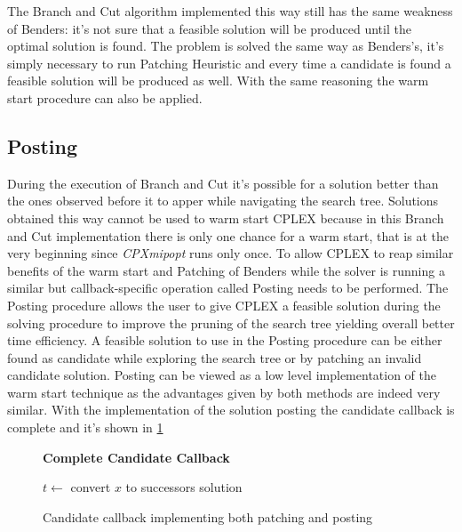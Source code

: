 The Branch and Cut algorithm implemented this way still has the same weakness of Benders: it's not sure that a feasible solution will be produced until the optimal solution is found.
The problem is solved the same way as Benders's, it's simply necessary to run Patching Heuristic and every time a candidate is found a feasible solution will be produced as well.
With the same reasoning the warm start procedure can also be applied.

\subsection{Posting}
During the execution of Branch and Cut it's possible for a solution better than the ones observed before it to apper while navigating the search tree.
Solutions obtained this way cannot be used to warm start CPLEX because in this Branch and Cut implementation there is only one chance for a warm start, that is at the very beginning since \textit{CPXmipopt} runs only once.
To allow CPLEX to reap similar benefits of the warm start and Patching of Benders while the solver is running a similar but callback-specific operation called Posting needs to be performed.
The Posting procedure allows the user to give CPLEX a feasible solution during the solving procedure to improve the pruning of the search tree yielding overall better time efficiency.
A feasible solution to use in the Posting procedure can be either found as candidate while exploring the search tree or by patching an invalid candidate solution.
Posting can be viewed as a low level implementation of the warm start technique as the advantages given by both methods are indeed very similar.
With the implementation of the solution posting the candidate callback is complete and it's shown in \figurename{ \ref{fig:callbackComplete}}

\begin{figure}[htbp]
	\textbf{Complete Candidate Callback} \\
	\begin{algorithm}[H]
		\vspace{2mm}
		$t \gets$ convert $x$ to successors solution\\
	\end{algorithm}
	\caption{Candidate callback implementing both patching and posting} \label{fig:callbackComplete}
\end{figure}

